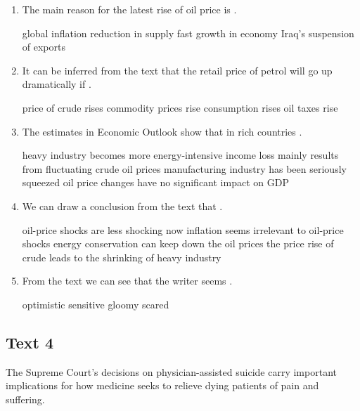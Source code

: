 \begin{enumerate}[resume]
	\item
 The main reason for the latest rise of oil price is \lineread.

\fourchoices
{global inflation}
{reduction in supply}
{fast growth in economy}
{Iraq's suspension of exports}


\item
It can be inferred from the text that the retail price of petrol
will go up dramatically if \lineread.

\fourchoices
{price of crude rises}
{commodity prices rise}
{consumption rises}
{oil taxes rise}


\item
The estimates in Economic Outlook show that in rich
countries \lineread.


\fourchoices
{heavy industry becomes more energy-intensive}
{income loss mainly results from fluctuating crude oil prices}
{manufacturing industry has been seriously squeezed}
{oil price changes have no significant impact on GDP}


\item
We can draw a conclusion from the text that \lineread.


\fourchoices
{oil-price shocks are less shocking now}
{inflation seems irrelevant to oil-price shocks}
{energy conservation can keep down the oil prices}
{the price rise of crude leads to the shrinking of heavy industry}


\item
 From the text we can see that the writer
seems \lineread.



\fourchoices
{optimistic}
{sensitive}
{gloomy}
{scared}

\end{enumerate}



\newpage
\subsection{Text 4}


The Supreme Court's decisions on physician-assisted suicide carry
important implications for how medicine seeks to relieve dying patients
of pain and suffering.

